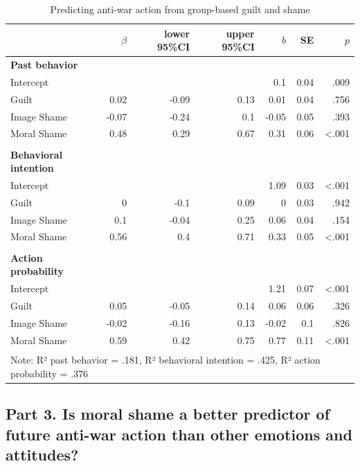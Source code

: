 \documentclass[
]{article}
\begin{document}
\begin{table}[H]
\centering
\caption{\label{tab:Table2}Predicting anti-war action from group-based guilt and shame}
\centering
\fontsize{8}{10}\selectfont
\begin{tabular}[t]{lrrrrrr}
\toprule
  & $\beta$ & lower 95\%CI & upper 95\%CI & $b$ & SE & $p$\\
\midrule
\textbf{Past behavior} & \textbf{} & \textbf{} & \textbf{} & \textbf{} & \textbf{} & \textbf{}\\
\midrule
Intercept &  &  &  & 0.1 & 0.04 & .009\\
Guilt & 0.02 & -0.09 & 0.13 & 0.01 & 0.04 & .756\\
Image Shame & -0.07 & -0.24 & 0.1 & -0.05 & 0.05 & .393\\
Moral Shame & 0.48 & 0.29 & 0.67 & 0.31 & 0.06 & <.001\\
\midrule\\
\textbf{Behavioral intention} & \textbf{} & \textbf{} & \textbf{} & \textbf{} & \textbf{} & \textbf{}\\
\midrule
Intercept &  &  &  & 1.09 & 0.03 & <.001\\
Guilt & 0 & -0.1 & 0.09 & 0 & 0.03 & .942\\
Image Shame & 0.1 & -0.04 & 0.25 & 0.06 & 0.04 & .154\\
Moral Shame & 0.56 & 0.4 & 0.71 & 0.33 & 0.05 & <.001\\
\midrule\\
\textbf{Action probability} & \textbf{} & \textbf{} & \textbf{} & \textbf{} & \textbf{} & \textbf{}\\
\midrule
Intercept &  &  &  & 1.21 & 0.07 & <.001\\
Guilt & 0.05 & -0.05 & 0.14 & 0.06 & 0.06 & .326\\
Image Shame & -0.02 & -0.16 & 0.13 & -0.02 & 0.1 & .826\\
Moral Shame & 0.59 & 0.42 & 0.75 & 0.77 & 0.11 & <.001\\
\bottomrule
\multicolumn{7}{l}{\textsuperscript{} Note: R² past behavior = .181, R² behavioral intention = .425, R² action probability = .376}\\
\end{tabular}
\end{table}

\subsection*{Part 3. Is moral shame a better predictor of future anti-war action than other emotions and attitudes?}\label{part-3.-is-moral-shame-a-better-predictor-of-future-anti-war-action-than-other-emotions-and-attitudes}
\end{document}
